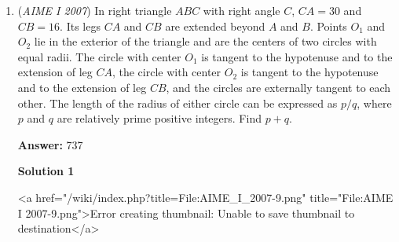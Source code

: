 \begin{enumerate}
\textbf{Solution 5}

Since $Q_1(x) = x^2 + (k - 29)x - k$ and $Q_2(x) = 2x^2 + (2k - 43)x + k$ are both factors of the cubic polynomial $P(x)$, and both are quadratics, the only way for them to divide the same cubic is if they share a common linear factor. Otherwise, their product would be degree 4, which is too large. Therefore, $P(x)$ can be factored as$P(x) = Q_1(x)(2x + a) = Q_2(x)(x + b)$for some constants $a, b$. We choose the linear factors so that both products have degree 3 with leading coefficient 2: since $Q_1$ has leading coefficient 1, its linear factor must have leading coefficient 2, and since $Q_2$ has leading coefficient 2, its linear factor must have leading coefficient 1.

 Looking at constant terms on both sides,$-k \cdot a = k \cdot b$,so$-k a = k b \implies a = -b.$

 Next, expanding both sides and comparing the $x^2$ coefficients gives$a + 2k - 58 = 2b + 2k - 43.$Substituting $a = -b$, we get$-b + 2k - 58 = 2b + 2k - 43 \implies -b = 2b + 15 \implies b = -5, \quad a = 5.$

 Finally, comparing the $x$ coefficients:$a(k - 29) - 2k = (2k - 43) b + k,$which becomes$5(k - 29) - 2k = (2k - 43)(-5) + k,$simplifying to$3k - 145 = -9k + 215.$Solving for $k$ yields$12k = 360 \implies \boxed{30}.$



	\item (\textit{AIME I 2007}) In right triangle $ABC$ with right angle $C$, $CA = 30$ and $CB = 16$.  Its legs $CA$ and $CB$ are extended beyond $A$ and $B$.  Points $O_1$ and $O_2$ lie in the exterior of the triangle and are the centers of two circles with equal radii.  The circle with center $O_1$ is tangent to the hypotenuse and to the extension of leg $CA$, the circle with center $O_2$ is tangent to the hypotenuse and to the extension of leg $CB$, and the circles are externally tangent to each other.  The length of the radius of either circle can be expressed as $p/q$, where $p$ and $q$ are relatively prime positive integers.  Find $p+q$.


 
 \textbf{Answer: }737



\textbf{Solution 1}

<a href="/wiki/index.php?title=File:AIME\_I\_2007-9.png" title="File:AIME I 2007-9.png">Error creating thumbnail: Unable to save thumbnail to destination</a>


\end{enumerate}
